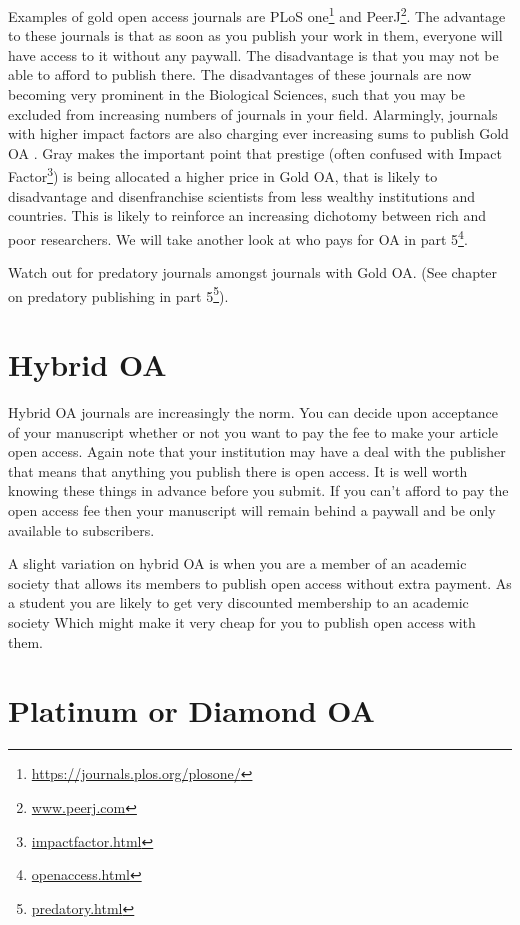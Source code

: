 \documentclass[
]{krantz}
\renewcommand{\href}[2]{#2\footnote{\url{#1}}}
\begin{document}
Examples of gold open access journals are \href{https://journals.plos.org/plosone/}{PLoS one} and \href{www.peerj.com}{PeerJ}. The advantage to these journals is that as soon as you publish your work in them, everyone will have access to it without any paywall. The disadvantage is that you may not be able to afford to publish there. The disadvantages of these journals are now becoming very prominent in the Biological Sciences, such that you may be excluded from increasing numbers of journals in your field. Alarmingly, journals with higher impact factors are also charging ever increasing sums to publish Gold OA \citep{gray2020sorry}. Gray \citeyearpar{gray2020sorry} makes the important point that prestige (often confused with \href{impactfactor.html}{Impact Factor}) is being allocated a higher price in Gold OA, that is likely to disadvantage and disenfranchise scientists from less wealthy institutions and countries. This is likely to reinforce an increasing dichotomy between rich and poor researchers. We will take another look at who pays for OA in \href{openaccess.html}{part 5}.

Watch out for predatory journals amongst journals with Gold OA. (See chapter on predatory publishing in \href{predatory.html}{part 5}).

\hypertarget{hybrid-oa}{%
\section{Hybrid OA}\label{hybrid-oa}}

Hybrid OA journals are increasingly the norm. You can decide upon acceptance of your manuscript whether or not you want to pay the fee to make your article open access. Again note that your institution may have a deal with the publisher that means that anything you publish there is open access. It is well worth knowing these things in advance before you submit. If you can't afford to pay the open access fee then your manuscript will remain behind a paywall and be only available to subscribers.

A slight variation on hybrid OA is when you are a member of an academic society that allows its members to publish open access without extra payment. As a student you are likely to get very discounted membership to an academic society Which might make it very cheap for you to publish open access with them.

\hypertarget{platinum-or-diamond-oa}{%
\section{Platinum or Diamond OA}\label{platinum-or-diamond-oa}}
\end{document}
